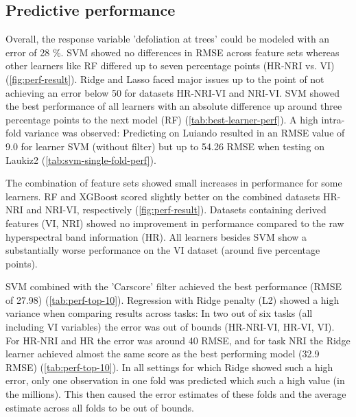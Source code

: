\documentclass[letterpaper, peerreview]{IEEEtran}
\begin{document}
\subsection{Predictive performance}

\noindent Overall, the response variable 'defoliation at trees' could be modeled with an error of 28 \%.
SVM showed no differences in RMSE across feature sets whereas other learners like RF differed up to seven percentage points (HR-NRI vs. VI) (\autoref{fig:perf-result}).
Ridge and Lasso faced major issues up to the point of not achieving an error below 50 for datasets HR-NRI-VI and NRI-VI.
SVM showed the best performance of all learners with an absolute difference up around three percentage points to the next model (RF) (\autoref{tab:best-learner-perf}).
A high intra-fold variance was observed: Predicting on Luiando resulted in an RMSE value of 9.0 for learner SVM (without filter) but up to 54.26 RMSE when testing on Laukiz2 (\autoref{tab:svm-single-fold-perf}).

The combination of feature sets showed small increases in performance for some learners.
RF and XGBoost scored slightly better on the combined datasets HR-NRI and NRI-VI, respectively (\autoref{fig:perf-result}).
Datasets containing derived features (VI, NRI) showed no improvement in performance compared to the raw hyperspectral band information (HR).
All learners besides SVM show a substantially worse performance on the VI dataset (around five percentage points).

SVM combined with the 'Carscore' filter achieved the best performance (RMSE of 27.98) (\autoref{tab:perf-top-10}).
Regression with Ridge penalty (L2) showed a high variance when comparing results across tasks: In two out of six tasks (all including VI variables) the error was out of bounds (HR-NRI-VI, HR-VI, VI). For HR-NRI and HR the error was around 40 RMSE, and for task NRI the Ridge learner achieved almost the same score as the best performing model (32.9 RMSE) (\autoref{tab:perf-top-10}).
In all settings for which Ridge showed such a high error, only one observation in one fold was predicted which such a high value (in the millions).
This then caused the error estimates of these folds and the average estimate across all folds to be out of bounds.
\end{document}
